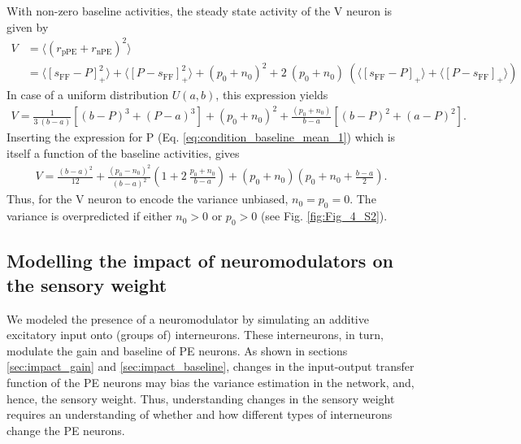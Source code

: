 \documentclass[10pt,a4paper]{article}
\begin{document}
With non-zero baseline activities, the steady state activity of the V neuron is given by
%
\begin{align}
\label{eq:condition_baseline_variance}
V &= \langle \left( r_\mathrm{pPE} + r_\mathrm{nPE} \right)^2 \rangle \\
&= \langle \left[ s_\mathrm{FF}-P\right]_+^2\rangle + \langle \left[ P-s_\mathrm{FF}\right]_+^2\rangle + (p_0 + n_0)^2 + 2\ (p_0 + n_0)\ \left( \langle \left[ s_\mathrm{FF}-P\right]_+\rangle + \langle \left[ P-s_\mathrm{FF}\right]_+ \rangle\right) \nonumber
\end{align}
%
In case of a uniform distribution $U(a,b)$, this expression yields
%
\begin{align}
\label{eq:condition_baseline_variance_1}
V = \frac{1}{3\ (b-a)} \left[ (b-P)^3 + (P-a)^3\right] + (p_0 + n_0)^2 + \frac{(p_0 + n_0)}{b-a} \left[ (b-P)^2 + (a-P)^2\right].
\end{align}
%
Inserting the expression for P (Eq. \ref{eq:condition_baseline_mean_1}) which is itself a function of the baseline activities, gives
%
\begin{align}
\label{eq:condition_baseline_variance_2}
V =  \frac{(b-a)^2}{12} + \frac{(p_0-n_0)^2}{(b-a)^2} \left( 1 + 2\ \frac{p_0+n_0}{b-a}\right) + (p_0 + n_0) \left( p_0 + n_0 + \frac{b-a}{2}\right).
\end{align}
%
Thus, for the V neuron to encode the variance unbiased, $n_0 = p_0 = 0$. The variance is overpredicted if either $n_0 > 0$ or $p_0 > 0$ (see Fig. \ref{fig:Fig_4_S2}).


\subsection{Modelling the impact of neuromodulators on the sensory weight}
%
We modeled the presence of a neuromodulator by simulating an additive excitatory input onto (groups of) interneurons. These interneurons, in turn, modulate the gain and baseline of PE neurons. As shown in sections \ref{sec:impact_gain} and \ref{sec:impact_baseline}, changes in the input-output transfer function of the PE neurons may bias the variance estimation in the network, and, hence, the sensory weight. Thus, understanding changes in the sensory weight requires an understanding of whether and how different types of interneurons change the PE neurons.
\end{document}
